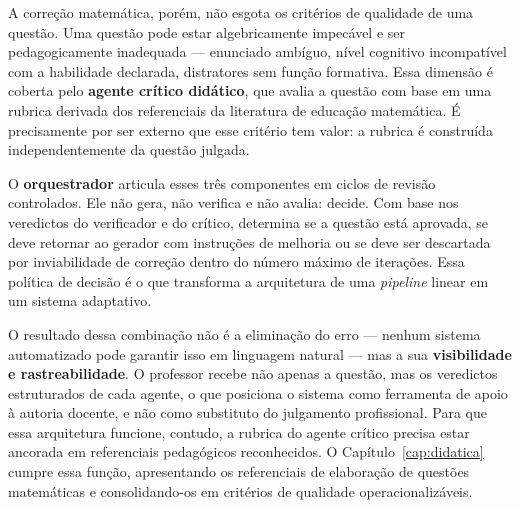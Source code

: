 A correção matemática, porém, não esgota os critérios de qualidade de uma questão. Uma questão pode
estar algebricamente impecável e ser pedagogicamente inadequada --- enunciado ambíguo, nível cognitivo
incompatível com a habilidade declarada, distratores sem função formativa. Essa dimensão é coberta
pelo \textbf{agente crítico didático}, que avalia a questão com base em uma rubrica derivada dos
referenciais da literatura de educação matemática. É precisamente por ser externo que esse critério
tem valor: a rubrica é construída independentemente da questão julgada.

O \textbf{orquestrador} articula esses três componentes em ciclos de revisão controlados. Ele não
gera, não verifica e não avalia: decide. Com base nos veredictos do verificador e do crítico,
determina se a questão está aprovada, se deve retornar ao gerador com instruções de melhoria ou se
deve ser descartada por inviabilidade de correção dentro do número máximo de iterações. Essa política
de decisão é o que transforma a arquitetura de uma \emph{pipeline} linear em um sistema adaptativo.

O resultado dessa combinação não é a eliminação do erro --- nenhum sistema automatizado pode garantir
isso em linguagem natural --- mas a sua \textbf{visibilidade e rastreabilidade}. O professor recebe não
apenas a questão, mas os veredictos estruturados de cada agente, o que posiciona o sistema como
ferramenta de apoio à autoria docente, e não como substituto do julgamento profissional. Para que essa
arquitetura funcione, contudo, a rubrica do agente crítico precisa estar ancorada em referenciais
pedagógicos reconhecidos. O Capítulo~\ref{cap:didatica} cumpre essa função, apresentando os referenciais
de elaboração de questões matemáticas e consolidando-os em critérios de qualidade operacionalizáveis.
